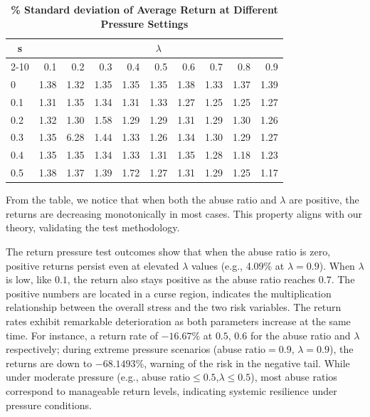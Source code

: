\documentclass[12pt]{article}
\begin{document}
{{{{{{\begin{appendices}
\begin{table}[ht]
\centering
\caption{\textbf{\% Standard deviation of Average Return at Different Pressure Settings}}
\begin{tabular}{l | *{9}{r}}
\toprule
\multicolumn{1}{c|}{\footnotesize{s}} & \multicolumn{9}{c}{$\lambda$} \\ 
 \cmidrule(lr){2-10} 
 {\footnotesize }& 0.1    & 0.2     & 0.3      & 0.4      & 0.5      & 0.6       & 0.7       & 0.8       & 0.9       \\
\midrule
0 & 1.38 & 1.32 & 1.35 & 1.35 & 1.35 & 1.38 & 1.33 & 1.37 & 1.39 \\
0.1 & 1.31 & 1.35 & 1.34 & 1.31 & 1.33 & 1.27 & 1.25 & 1.25 & 1.27 \\
0.2 & 1.32 & 1.30 & 1.58 & 1.29 & 1.29 & 1.31 & 1.29 & 1.30 & 1.26 \\
0.3 & 1.35 & 6.28 & 1.44 & 1.33 & 1.26 & 1.34 & 1.30 & 1.29 & 1.27 \\
0.4 & 1.35 & 1.35 & 1.34 & 1.33 & 1.31 & 1.35 & 1.28 & 1.18 & 1.23 \\
0.5 & 1.38 & 1.37 & 1.39 & 1.72 & 1.27 & 1.31 & 1.29 & 1.25 & 1.17 \\
\bottomrule

\end{tabular}
\end{table}

From the table, we notice that when both the abuse ratio and $\lambda$ are positive, the returns are decreasing monotonically in most cases. This property aligns with our theory, validating the test methodology.

The return pressure test outcomes show that when the abuse ratio is zero,  positive returns persist even at elevated $\lambda$ values (e.g., 4.09\% at $\lambda=0.9$). When $\lambda$ is low, like $0.1$, the return also stays positive as the abuse ratio reaches $0.7$. The positive numbers are located in a curse region, indicates the multiplication relationship between the overall stress and the two risk variables. The return rates exhibit remarkable deterioration as both parameters increase at the same time. For instance, a return rate of $-16.67\%$ at $0.5,\,0.6$ for the abuse ratio and $\lambda$ respectively; during extreme pressure scenarios (abuse ratio$=0.9$, $\lambda=0.9$), the returns are down to $-68.1493\%$, warning of the risk in the negative tail. While under moderate pressure (e.g., abuse ratio$\leq0.5$,$\lambda\leq0.5$), most abuse ratios correspond to manageable return levels, indicating systemic resilience under pressure conditions.


\end{appendices}}}}}}}
\end{document}

